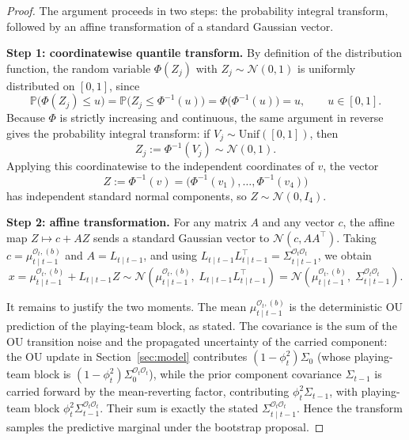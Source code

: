 \begin{proof}
The argument proceeds in two steps: the probability integral transform, followed by an affine transformation of a standard Gaussian vector.

\textbf{Step 1: coordinatewise quantile transform.} By definition of the distribution function, the random variable $\Phi(Z_j)$ with $Z_j \sim \mathcal{N}(0,1)$ is uniformly distributed on $[0,1]$, since
\[
\mathbb{P}\big( \Phi(Z_j) \le u \big) = \mathbb{P}\big( Z_j \le \Phi^{-1}(u) \big) = \Phi\big( \Phi^{-1}(u) \big) = u, \qquad u \in [0,1].
\]
Because $\Phi$ is strictly increasing and continuous, the same argument in reverse gives the probability integral transform: if $V_j \sim \mathrm{Unif}([0,1])$, then
\[
Z_j := \Phi^{-1}(V_j) \sim \mathcal{N}(0,1).
\]
Applying this coordinatewise to the independent coordinates of $v$, the vector
\[
Z := \Phi^{-1}(v) = \big( \Phi^{-1}(v_1), \ldots, \Phi^{-1}(v_4) \big)
\]
has independent standard normal components, so $Z \sim \mathcal{N}(0, I_4)$.

\textbf{Step 2: affine transformation.} For any matrix $A$ and any vector $c$, the affine map $Z \mapsto c + AZ$ sends a standard Gaussian vector to $\mathcal{N}(c, AA^{\top})$. Taking $c = \mu_{t \mid t-1}^{\mathcal{O}_t,(b)}$ and $A = L_{t \mid t-1}$, and using $L_{t \mid t-1} L_{t \mid t-1}^{\top} = \Sigma_{t \mid t-1}^{\mathcal{O}_t \mathcal{O}_t}$, we obtain
\[
x = \mu_{t \mid t-1}^{\mathcal{O}_t,(b)} + L_{t \mid t-1} Z \sim \mathcal{N}\!\left( \mu_{t \mid t-1}^{\mathcal{O}_t,(b)},\; L_{t \mid t-1} L_{t \mid t-1}^{\top} \right) = \mathcal{N}\!\left( \mu_{t \mid t-1}^{\mathcal{O}_t,(b)},\; \Sigma_{t \mid t-1}^{\mathcal{O}_t \mathcal{O}_t} \right).
\]

It remains to justify the two moments. The mean $\mu_{t \mid t-1}^{\mathcal{O}_t,(b)}$ is the deterministic OU prediction of the playing-team block, as stated. The covariance is the sum of the OU transition noise and the propagated uncertainty of the carried component: the OU update in Section~\ref{sec:model} contributes $(1-\phi_t^2)\Sigma_0$ (whose playing-team block is $(1-\phi_t^2)\Sigma_0^{\mathcal{O}_t\mathcal{O}_t}$), while the prior component covariance $\Sigma_{t-1}$ is carried forward by the mean-reverting factor, contributing $\phi_t^2\Sigma_{t-1}$, with playing-team block $\phi_t^2\Sigma_{t-1}^{\mathcal{O}_t\mathcal{O}_t}$. Their sum is exactly the stated $\Sigma_{t \mid t-1}^{\mathcal{O}_t \mathcal{O}_t}$. Hence the transform samples the predictive marginal under the bootstrap proposal. 
\end{proof}

